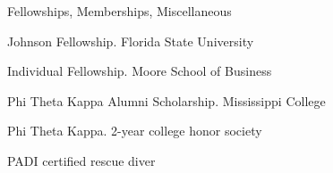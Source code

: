 \documentclass{resume} %
\begin{document}



\begin{rSection}{Fellowships, Memberships, Miscellaneous}
	\item Johnson Fellowship. Florida State University
	\item Individual Fellowship. Moore School of Business
	\item Phi Theta Kappa Alumni Scholarship. Mississippi College
	\item Phi Theta Kappa. 2-year college honor society
	\item PADI certified rescue diver
\end{rSection}





\end{document}
